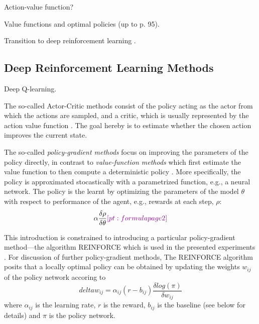 Action-value function? 

Value functions and optimal policies (up to p. 95).

Transition to deep reinforcement learning \parencite{lecun2015deep}.

\subsection{Deep Reinforcement Learning Methods}

Deep Q-learning. 

The so-called Actor-Critic methods consist of the policy acting as the actor from which the actions are sampled, and a critic, which is usually represented by the action value function . The goal hereby is to estimate whether the chosen action improves the current state.  

The so-called \textit{policy-gradient methods} focus on improving the parameters of the policy directly, in contrast to \textit{value-function methods} which first estimate the value function to then compute a deterministic policy \parencite{sutton2018reinforcement} . %
More specifically, the policy is approximated stocastically with a parametrized function, e.g., a neural network. The policy is the learnt by optimizing the parameters of the model $\theta$ with respect to performance of the agent, e.g., rewards at each step, $\rho$: $$ \alpha \frac{\delta \rho}{\delta \theta} \pt{formula page 2} $$ 

This introduction is constrained to introducing a particular policy-gradient method---the algorithm REINFORCE which is used in the presented experiments \parencite{williams1992simple}. For discussion of further policy-gradient methods,  
The REINFORCE algorithm posits that a locally optimal policy can be obtained by updating the weights $w_{ij}$ of the policy network accoring to 
$$delta w_{ij} = \alpha_{ij} (r - b_{ij}) \frac{\delta log(\pi)}{\delta w_{ij}}$$
where $\alpha_{ij}$ is the learning rate, $r$ is the reward, $b_{ij}$ is the baseline (see below for details) and $\pi$ is the policy network. 

